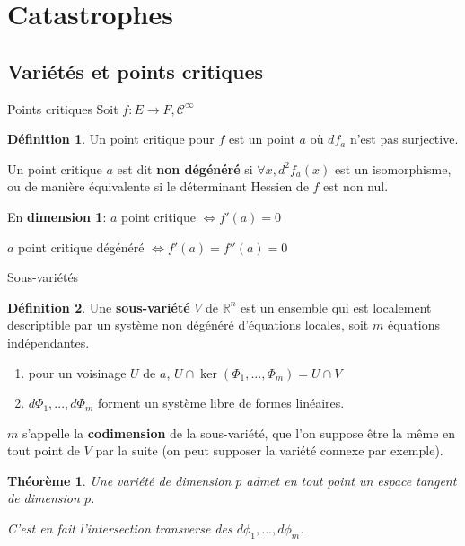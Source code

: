\documentclass[compress]{beamer}
\newcommand{\cinf}{\mathcal{C}^\infty}
\newcommand{\R}{\mathbb{R}}
\newtheorem{thm}{Théorème}
\theoremstyle{definition}
\newtheorem{defn}{Définition}
\begin{document}
\section{Catastrophes}

\subsection{Variétés et points critiques}
\begin{frame}{Points critiques}
    Soit $f: E \to F, \cinf$
    \begin{defn}
        Un point critique pour $f$ est un point $a$ où $df_a$ n'est \alert{pas surjective}.

	    Un point critique $a$ est dit \textbf{non dégénéré} si $\forall x, d^2f_a(x)$ est un \alert{isomorphisme}, ou de manière équivalente si le déterminant Hessien de $f$ est non nul.
    \end{defn}

    \pause
    En \textbf{dimension 1}: $a$ point critique $\iff f'(a) = 0$

    $a$ point critique dégénéré $\iff f'(a) =f''(a) = 0$
\end{frame}

\begin{frame}{Sous-variétés}
    \begin{defn}
        Une \textbf{sous-variété} $V$ de $\R^n$ est un ensemble qui est localement descriptible par un \alert{système non dégénéré d'équations locales}, soit $m$ équations indépendantes.
        \begin{enumerate}[<+->]
            \item pour un voisinage $U$ de $a$, $U\cap\ker(\Phi_1,...,\Phi_m)=U\cap V$
            \item $d\Phi_1,...,d\Phi_m$ forment un système libre de formes linéaires.
        \end{enumerate}
        \pause[3]
        $m$ s'appelle la \textbf{codimension} de la sous-variété, que l'on suppose être la même en tout point de $V$ par la suite (on peut supposer la variété connexe par exemple).
    \end{defn}

    \pause[4]
    \begin{thm}
        Une variété de dimension $p$ admet en tout point un \alert{espace tangent} de dimension $p$.

        C'est en fait l'intersection transverse des $d\phi_1,...,d\phi_m$.
    \end{thm}
\end{frame}
\end{document}
